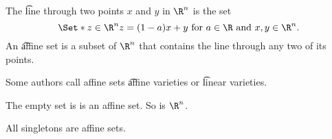 


The \t{line through} two points $x$ and $y$ in $\R^n$ is the set
$$
  \Set*{z \in \R^n}{z = (1-a) x + y \text{ for } a \in \R \text{ and } x, y \in \R^n}.
$$
An \t{affine} set is a subset of $\R^n$ that contains the line through any two of its points.


Some authors call affine sets \t{affine varieties} or \t{linear varieties}.



The empty set is is an affine set.
So is $\R^n$.
\begin{prop}
  All singletons are affine sets.
\end{prop}
